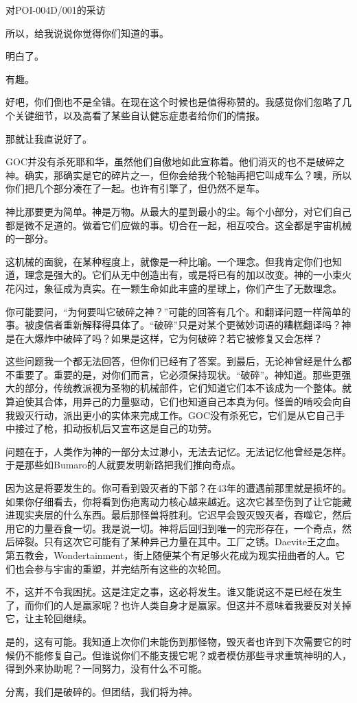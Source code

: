 对POI-004D/001的采访 \\

\begin{scpbox}

所以，给我说说你觉得你们知道的事。

明白了。

有趣。

好吧，你们倒也不是全错。在现在这个时候也是值得称赞的。我感觉你们忽略了几个关键细节，以及高看了某些自认健忘症患者给你们的情报。

那就让我直说好了。

GOC并没有杀死耶和华，虽然他们自傲地如此宣称着。他们消灭的也不是破碎之神。确实，那确实是它的碎片之一，但你会给我个轮轴再把它叫成车么？噢，所以你们把几个部分凑在了一起。也许有引擎了，但仍然不是车。

神比那要更为简单。神是万物。从最大的星到最小的尘。每个小部分，对它们自己都是微不足道的。做着它们应做的事。切合在一起，相互咬合。这全都是宇宙机械的一部分。

这机械的面貌，在某种程度上，就像是一种比喻。一个理念。但我肯定你们也知道，理念是强大的。它们从无中创造出有，或是将已有的加以改变。神的一小束火花闪过，象征成为真实。在一颗生命如此丰盛的星球上，你们产生了无数理念。

你可能要问，“为何要叫它破碎之神？”可能的回答有几个。和翻译问题一样简单的事。被虔信者重新解释得具体了。“破碎”只是对某个更微妙词语的糟糕翻译吗？神是在大爆炸中破碎了吗？如果是这样，它为何破碎？若它被修复又会怎样？

这些问题我一个都无法回答，但你们已经有了答案。到最后，无论神曾经是什么都不重要了。重要的是，对你们而言，它必须保持现状。“破碎”。神知道。那些更强大的部分，传统教派视为圣物的机械部件，它们知道它们本不该成为一个整体。就算迫使其合体，用异己的力量驱动，它们也知道自己本真为何。怪兽的啃咬会向自我毁灭行动，派出更小的实体来完成工作。GOC没有杀死它，它们是从它自己手中接过了枪，扣动扳机后又宣布这是自己的功劳。

问题在于，人类作为神的一部分太过渺小，无法去记忆。无法记忆他曾经是怎样。于是那些如Bumaro的人就要发明新路把我们推向奇点。

因为这是将要发生的。你可看到毁灭者的下部？在43年的遭遇前那里就是损坏的。如果你仔细看去，你将看到伤疤离动力核心越来越近。这次它甚至伤到了让它能藏进现实夹层的什么东西。最后那怪兽将胜利。它迟早会毁灭毁灭者，吞噬它，然后用它的力量吞食一切。我是说一切。神将后回归到唯一的完形存在，一个奇点，然后碎裂。只有这次它可能有了某种异己力量在其中。工厂之锈。Daevite王之血。第五教会，Wondertainment，街上随便某个有足够火花成为现实扭曲者的人。它们也会参与宇宙的重塑，并完结所有这些的次轮回。

不，这并不令我困扰。这是注定之事，这必将发生。谁又能说这不是已经在发生了，而你们的人是赢家呢？也许人类自身才是赢家。但这并不意味着我要反对关掉它，让主轮回继续。

是的，这有可能。我知道上次你们未能伤到那怪物，毁灭者也许到下次需要它的时候仍不能修复自己。但谁说你们不能支援它呢？或者模仿那些寻求重筑神明的人，得到外来协助呢？一同努力，没有什么不可能。

分离，我们是破碎的。但团结，我们将为神。

\end{scpbox}
